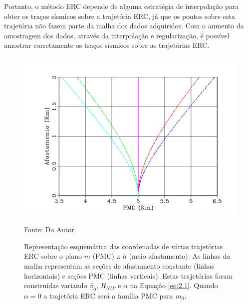 Portanto, o método ERC depende de alguma estratégia de interpolação para obter os traços sísmicos sobre a trajetória ERC, já
que os pontos sobre esta trajetória não fazem parte da malha dos dados adquiridos. Com o aumento da amostragem dos dados,
através da interpolação e regularização, é possível amostrar corretamente os traços sísmicos sobre as trajetórias ERC.

\begin{figure}[htb]
\caption{Representação esquemática das coordenadas de várias trajetórias ERC sobre o plano $m$ (PMC) x $h$ (meio afastamento).
As linhas da malha representam as seções de afastamento constante (linhas horizontais) e seções PMC (linhas verticais).
Estas trajetórias foram construídas variando $\beta_0$, $R_{NIP}$ e $\alpha$  na Equação \ref{eq:2.1}. Quando
$\alpha=0$ a trajetória ERC será a família PMC para $m_0$.}
\begin{center}
\includegraphics[scale=0.5]{images/creCoord.png}
\vspace{-0.3cm}
\end{center}
\begin{center}
 Fonte: Do Autor.
\end{center}
\label{fig:2.2}
\end{figure}

